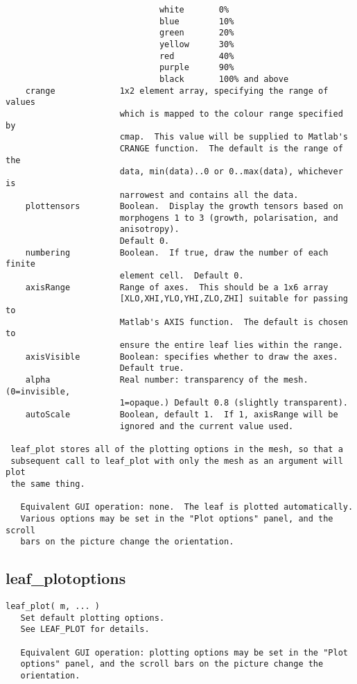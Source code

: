 \begin{verbatim}
                               white       0%
                               blue        10%
                               green       20%
                               yellow      30%
                               red         40%
                               purple      90%
                               black       100% and above
    crange             1x2 element array, specifying the range of values
                       which is mapped to the colour range specified by
                       cmap.  This value will be supplied to Matlab's
                       CRANGE function.  The default is the range of the
                       data, min(data)..0 or 0..max(data), whichever is
                       narrowest and contains all the data.
    plottensors        Boolean.  Display the growth tensors based on
                       morphogens 1 to 3 (growth, polarisation, and
                       anisotropy).
                       Default 0.
    numbering          Boolean.  If true, draw the number of each finite
                       element cell.  Default 0.
    axisRange          Range of axes.  This should be a 1x6 array
                       [XLO,XHI,YLO,YHI,ZLO,ZHI] suitable for passing to
                       Matlab's AXIS function.  The default is chosen to
                       ensure the entire leaf lies within the range.
    axisVisible        Boolean: specifies whether to draw the axes.
                       Default true.
    alpha              Real number: transparency of the mesh. (0=invisible,
                       1=opaque.) Default 0.8 (slightly transparent).
    autoScale          Boolean, default 1.  If 1, axisRange will be
                       ignored and the current value used.

 leaf_plot stores all of the plotting options in the mesh, so that a
 subsequent call to leaf_plot with only the mesh as an argument will plot
 the same thing.

   Equivalent GUI operation: none.  The leaf is plotted automatically.
   Various options may be set in the "Plot options" panel, and the scroll
   bars on the picture change the orientation.
\end{verbatim}

\subsection{leaf\_plotoptions}\label{section-leaf-plotoptions}

\begin{verbatim}
leaf_plot( m, ... )
   Set default plotting options.
   See LEAF_PLOT for details.

   Equivalent GUI operation: plotting options may be set in the "Plot
   options" panel, and the scroll bars on the picture change the
   orientation.
\end{verbatim}

